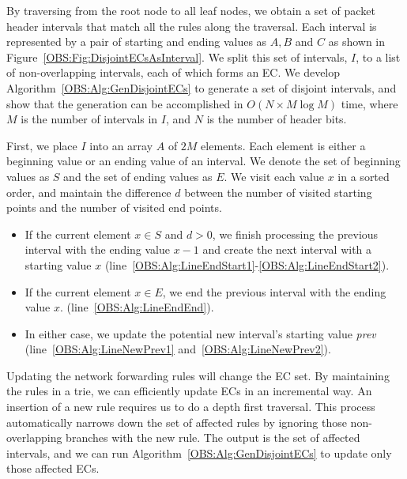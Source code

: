 By traversing from the root node to all leaf nodes, we obtain a set of packet header intervals that match all the rules along the traversal.
Each interval is represented by a pair of starting and ending values as $A, B$ and $C$ as shown in Figure~\ref{OBS:Fig:DisjointECsAsInterval}.
We split this set of intervals, $I$, to a list of non-overlapping intervals, each of which forms an EC.
We develop Algorithm~\ref{OBS:Alg:GenDisjointECs} to generate a set of disjoint intervals, and show that the generation can be
accomplished in $O(N \times M\log M)$ time,
where $M$ is the number of intervals in $I$, and $N$ is the number of header bits.

First, we place $I$ into an array $A$ of $2M$ elements. Each element is either a beginning value or an ending value of an interval. We denote the set of beginning values as $S$ and the set of ending values as $E$. We visit each value $x$ in a sorted order, and maintain the difference $d$ between the number of visited starting points and the number of visited end points.
\begin{itemize}
    \item If the current element $x \in S$ and $d > 0$,
        we finish processing the previous interval with the ending value $x - 1$ and
        create the next interval with a starting value $x$
        (line~\ref{OBS:Alg:LineEndStart1}-\ref{OBS:Alg:LineEndStart2}).
    \item If the current element $x \in E$, we end the previous interval with the ending value $x$.
        (line~\ref{OBS:Alg:LineEndEnd}).
    \item In either case, we update the potential new interval's starting value \textit{prev}
        (line~\ref{OBS:Alg:LineNewPrev1} and~\ref{OBS:Alg:LineNewPrev2}).
\end{itemize}

Updating the network forwarding rules will change the EC set.
By maintaining the rules in a trie, we can efficiently update ECs in an incremental way. An insertion of a new rule requires us to do a depth first traversal. This process automatically narrows down the set of affected rules by ignoring those non-overlapping branches with the new rule.
The output is the set of affected intervals, and we can run Algorithm~\ref{OBS:Alg:GenDisjointECs} to update only those affected ECs.

